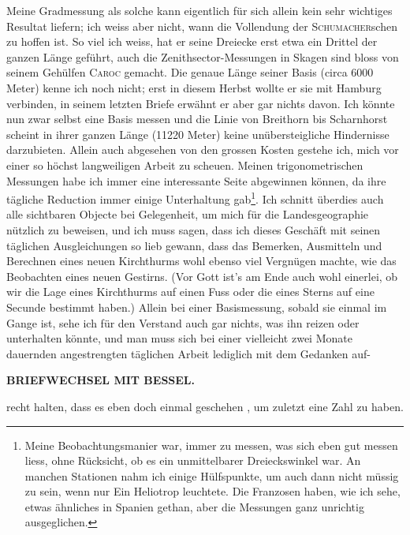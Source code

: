 \par\noindent\hspace*{\parindent}Meine Gradmessung als solche kann eigentlich für sich allein kein sehr wichtiges Resultat liefern; ich weiss aber nicht, wann die Vollendung der \textsc{Schumacher}schen zu hoffen ist.
So viel ich weiss, hat er seine Dreiecke erst etwa ein Drittel der ganzen Länge geführt, auch die Zenithsector-Messungen in Skagen sind bloss von seinem Gehülfen \textsc{Caroc} gemacht.
Die genaue Länge seiner Basis (circa 6000 Meter) kenne ich noch nicht; erst in diesem Herbst wollte er sie mit Hamburg verbinden, in seinem letzten Briefe erwähnt er aber gar nichts davon.
Ich könnte nun zwar selbst eine Basis messen und die Linie von Breithorn bis Scharnhorst scheint in ihrer ganzen Länge (11220 Meter) keine unübersteigliche Hindernisse darzubieten.
Allein auch abgesehen von den grossen Kosten gestehe ich, mich vor einer so höchst langweiligen Arbeit zu scheuen.
Meinen trigonometrischen Messungen habe ich immer eine interessante Seite abgewinnen können, da ihre tägliche Reduction immer einige Unterhaltung gab\footnote{Meine Beobachtungsmanier war, immer zu messen, was sich eben gut messen liess, ohne Rücksicht, ob es ein unmittelbarer Dreieckswinkel war. An manchen Stationen nahm ich einige Hülfspunkte, um auch dann nicht müssig zu sein, wenn nur Ein Heliotrop leuchtete. Die Franzosen haben, wie ich sehe, etwas ähnliches in Spanien gethan, aber die Messungen ganz unrichtig ausgeglichen.}.
Ich schnitt überdies auch alle sichtbaren Objecte bei Gelegenheit, um mich für die Landesgeographie nützlich zu beweisen, und ich muss sagen, dass ich dieses Geschäft mit seinen täglichen Ausgleichungen so lieb gewann, dass das Bemerken, Ausmitteln und Berechnen eines neuen Kirchthurms wohl ebenso viel Vergnügen machte, wie das Beobachten eines neuen Gestirns.
(Vor Gott ist's am Ende auch wohl einerlei, ob wir die Lage eines Kirchthurms auf einen Fuss oder die eines Sterns auf eine Secunde bestimmt haben.)
Allein bei einer Basismessung, sobald sie einmal im Gange ist, sehe ich für den Verstand auch gar nichts, was ihn reizen oder unterhalten könnte, und man muss sich bei einer vielleicht zwei Monate dauernden angestrengten täglichen Arbeit lediglich mit dem Gedanken auf-
\par\clearpage
{}\hfill{\small\textbf{BRIEFWECHSEL MIT BESSEL.}}\par\medskip
\noindent recht halten, dass es eben doch einmal geschehen , um zuletzt eine Zahl zu haben.

